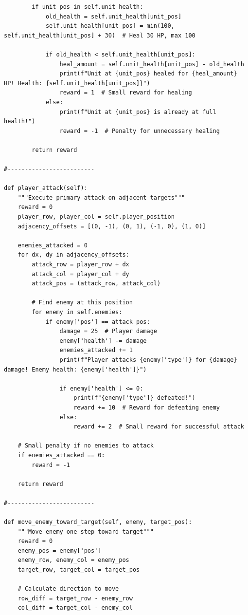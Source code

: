 \documentclass{article} %
\begin{document}
\begin{lstlisting}
        if unit_pos in self.unit_health:
            old_health = self.unit_health[unit_pos]
            self.unit_health[unit_pos] = min(100, self.unit_health[unit_pos] + 30)  # Heal 30 HP, max 100
            
            if old_health < self.unit_health[unit_pos]:
                heal_amount = self.unit_health[unit_pos] - old_health
                print(f"Unit at {unit_pos} healed for {heal_amount} HP! Health: {self.unit_health[unit_pos]}")
                reward = 1  # Small reward for healing
            else:
                print(f"Unit at {unit_pos} is already at full health!")
                reward = -1  # Penalty for unnecessary healing
        
        return reward

#-------------------------

def player_attack(self):
    """Execute primary attack on adjacent targets"""
    reward = 0
    player_row, player_col = self.player_position
    adjacency_offsets = [(0, -1), (0, 1), (-1, 0), (1, 0)]
    
    enemies_attacked = 0
    for dx, dy in adjacency_offsets:
        attack_row = player_row + dx
        attack_col = player_col + dy
        attack_pos = (attack_row, attack_col)
        
        # Find enemy at this position
        for enemy in self.enemies:
            if enemy['pos'] == attack_pos:
                damage = 25  # Player damage
                enemy['health'] -= damage
                enemies_attacked += 1
                print(f"Player attacks {enemy['type']} for {damage} damage! Enemy health: {enemy['health']}")
                
                if enemy['health'] <= 0:
                    print(f"{enemy['type']} defeated!")
                    reward += 10  # Reward for defeating enemy
                else:
                    reward += 2  # Small reward for successful attack
    
    # Small penalty if no enemies to attack
    if enemies_attacked == 0:
        reward = -1
        
    return reward

#-------------------------

def move_enemy_toward_target(self, enemy, target_pos):
    """Move enemy one step toward target"""
    reward = 0
    enemy_pos = enemy['pos']
    enemy_row, enemy_col = enemy_pos
    target_row, target_col = target_pos
    
    # Calculate direction to move
    row_diff = target_row - enemy_row
    col_diff = target_col - enemy_col
    

\end{lstlisting}
\end{document}
